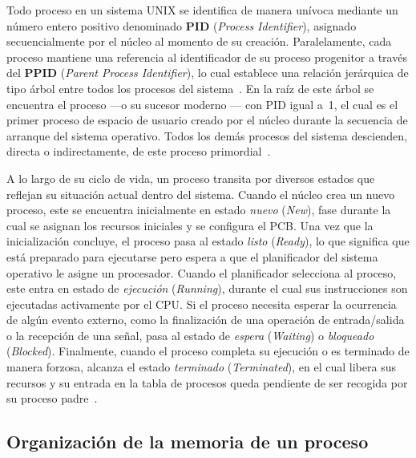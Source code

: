 Todo proceso en un sistema UNIX se identifica de manera unívoca mediante un número entero positivo denominado \textbf{PID} (\textit{Process Identifier}), asignado secuencialmente por el núcleo al momento de su creación. Paralelamente, cada proceso mantiene una referencia al identificador de su proceso progenitor a través del \textbf{PPID} (\textit{Parent Process Identifier}), lo cual establece una relación jerárquica de tipo árbol entre todos los procesos del sistema~\cite{stevens2013}. En la raíz de este árbol se encuentra el proceso  ---o su sucesor moderno --- con PID igual a~1, el cual es el primer proceso de espacio de usuario creado por el núcleo durante la secuencia de arranque del sistema operativo. Todos los demás procesos del sistema descienden, directa o indirectamente, de este proceso primordial~\cite{tanenbaum2015}.

A lo largo de su ciclo de vida, un proceso transita por diversos estados que reflejan su situación actual dentro del sistema. Cuando el núcleo crea un nuevo proceso, este se encuentra inicialmente en estado \textit{nuevo} (\textit{New}), fase durante la cual se asignan los recursos iniciales y se configura el PCB. Una vez que la inicialización concluye, el proceso pasa al estado \textit{listo} (\textit{Ready}), lo que significa que está preparado para ejecutarse pero espera a que el planificador del sistema operativo le asigne un procesador. Cuando el planificador selecciona al proceso, este entra en estado de \textit{ejecución} (\textit{Running}), durante el cual sus instrucciones son ejecutadas activamente por el CPU. Si el proceso necesita esperar la ocurrencia de algún evento externo, como la finalización de una operación de entrada/salida o la recepción de una señal, pasa al estado de \textit{espera} (\textit{Waiting}) o \textit{bloqueado} (\textit{Blocked}). Finalmente, cuando el proceso completa su ejecución o es terminado de manera forzosa, alcanza el estado \textit{terminado} (\textit{Terminated}), en el cual libera sus recursos y su entrada en la tabla de procesos queda pendiente de ser recogida por su proceso padre~\cite{silberschatz2018, tanenbaum2015}.

\subsection{Organización de la memoria de un proceso}
\label{subsec:memoria_proceso}

